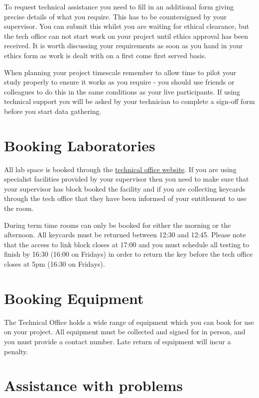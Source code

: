 \documentclass[
]{book}
\begin{document}
To request technical assistance you need to fill in an additional form giving precise details of what you require. This has to be countersigned by your supervisor. You can submit this whilst you are waiting for ethical clearance, but the tech office can not start work on your project until ethics approval has been received. It is worth discussing your requirements as soon as you hand in your ethics form as work is dealt with on a first come first served basis.

When planning your project timescale remember to allow time to pilot your study properly to ensure it works as you require - you should use friends or colleagues to do this in the same conditions as your live participants. If using technical support you will be asked by your technician to complete a sign-off form before you start data gathering.

\section{Booking Laboratories}\label{booking-laboratories}

All lab space is booked through the \href{https://psy.plymouth.ac.uk}{technical office website}. If you are using specialist facilities provided by your supervisor then you need to make sure that your supervisor has block booked the facility and if you are collecting keycards through the tech office that they have been informed of your entitlement to use the room.

During term time rooms can only be booked for either the morning or the afternoon. All keycards must be returned between 12:30 and 12:45. Please note that the access to link block closes at 17:00 and you must schedule all testing to finish by 16:30 (16:00 on Fridays) in order to return the key before the tech office closes at 5pm (16:30 on Fridays).

\section{Booking Equipment}\label{booking-equipment}

The Technical Office holds a wide range of equipment which you can book for use on your project. All equipment must be collected and signed for in person, and you must provide a contact number. Late return of equipment will incur a penalty.

\section{Assistance with problems}\label{assistance-with-problems}
\end{document}
